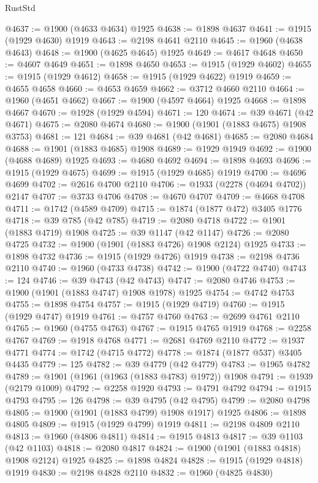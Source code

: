 \begin{lexlean}{RustStd}
\begin{coremodule}
{\begin{coremodule}
{{{{{{{{{{{{{{{{{{{{{{{{{{{{{{{{{{{{{{{{{{{@4637 := @1900 (@4633 @4634) @1925
@4638 := @1898 @4637
@4641 := @1915 (@1929 @4630) @1919
@4643 := @2198 @4641 @2110
@4645 := @1960 (@4638 @4643)
@4648 := @1900 (@4625 @4645) @1925
@4649 := @4617 @4648
@4650 := @4607 @4649
@4651 := @1898 @4650
@4653 := @1915 (@1929 @4602)
@4655 := @1915 (@1929 @4612)
@4658 := @1915 (@1929 @4622) @1919
@4659 := @4655 @4658
@4660 := @4653 @4659
@4662 := @3712 @4660 @2110
@4664 := @1960 (@4651 @4662)
@4667 := @1900 (@4597 @4664) @1925
@4668 := @1898 @4667
@4670 := @1928 (@1929 @4594)
@4671 := 120
@4674 := @39 @4671 (@42 @4671)
@4675 := @2080 @4674
@4680 := @1900 (@1901 (@1883 @4675) @1908 @3753)
@4681 := 121
@4684 := @39 @4681 (@42 @4681)
@4685 := @2080 @4684
@4688 := @1901 (@1883 @4685) @1908
@4689 := @1929 @1949
@4692 := @1900 (@4688 @4689) @1925
@4693 := @4680 @4692
@4694 := @1898 @4693
@4696 := @1915 (@1929 @4675)
@4699 := @1915 (@1929 @4685) @1919
@4700 := @4696 @4699
@4702 := @2616 @4700 @2110
@4706 := @1933 (@2278 (@4694 @4702)) @2147
@4707 := @3733 @4706
@4708 := @4670 @4707
@4709 := @4668 @4708
@4711 := @1742 (@4589 @4709)
@4715 := @1874 (@1877 @472) @3405 @1776
@4718 := @39 @785 (@42 @785)
@4719 := @2080 @4718
@4722 := @1901 (@1883 @4719) @1908
@4725 := @39 @1147 (@42 @1147)
@4726 := @2080 @4725
@4732 := @1900 (@1901 (@1883 @4726) @1908 @2124) @1925
@4733 := @1898 @4732
@4736 := @1915 (@1929 @4726) @1919
@4738 := @2198 @4736 @2110
@4740 := @1960 (@4733 @4738)
@4742 := @1900 (@4722 @4740)
@4743 := 124
@4746 := @39 @4743 (@42 @4743)
@4747 := @2080 @4746
@4753 := @1900 (@1901 (@1883 @4747) @1908 @1978) @1925
@4754 := @4742 @4753
@4755 := @1898 @4754
@4757 := @1915 (@1929 @4719)
@4760 := @1915 (@1929 @4747) @1919
@4761 := @4757 @4760
@4763 := @2699 @4761 @2110
@4765 := @1960 (@4755 @4763)
@4767 := @1915 @4765 @1919
@4768 := @2258 @4767
@4769 := @1918 @4768
@4771 := @2681 @4769 @2110
@4772 := @1937 @4771
@4774 := @1742 (@4715 @4772)
@4778 := @1874 (@1877 @537) @3405 @4435
@4779 := 125
@4782 := @39 @4779 (@42 @4779)
@4783 := @1965 @4782
@4789 := @1901 (@1961 (@1963 (@1883 @4783) @1972)) @1908
@4791 := @1939 (@2179 @1009)
@4792 := @2258 @1920
@4793 := @4791 @4792
@4794 := @1915 @4793
@4795 := 126
@4798 := @39 @4795 (@42 @4795)
@4799 := @2080 @4798
@4805 := @1900 (@1901 (@1883 @4799) @1908 @1917) @1925
@4806 := @1898 @4805
@4809 := @1915 (@1929 @4799) @1919
@4811 := @2198 @4809 @2110
@4813 := @1960 (@4806 @4811)
@4814 := @1915 @4813
@4817 := @39 @1103 (@42 @1103)
@4818 := @2080 @4817
@4824 := @1900 (@1901 (@1883 @4818) @1908 @2124) @1925
@4825 := @1898 @4824
@4828 := @1915 (@1929 @4818) @1919
@4830 := @2198 @4828 @2110
@4832 := @1960 (@4825 @4830)
}}}}}}}}}}}}}}}}}}}}}}}}}}}}}}}}}}}}}}}}}}}
\end{coremodule}}
\end{coremodule}
\end{lexlean}
